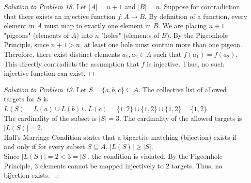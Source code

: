\documentclass[11pt, letterpaper]{article}
\theoremstyle{definition}
\theoremstyle{remark}
\begin{document}
\begin{proof}[Solution to Problem 18]
Let $|A| = n + 1$ and $|B| = n$. Suppose for contradiction that there exists an injective function $f : A \to B$. By definition of a function, every element in $A$ must map to exactly one element in $B$. We are placing $n + 1$ "pigeons" (elements of $A$) into $n$ "holes" (elements of $B$). By the Pigeonhole Principle, since $n + 1 > n$, at least one hole must contain more than one pigeon. Therefore, there exist distinct elements $a_1, a_2 \in A$ such that $f(a_1) = f(a_2)$. This directly contradicts the assumption that $f$ is injective. Thus, no such injective function can exist.
\end{proof}

\begin{proof}[Solution to Problem 19]
Let $S = \{a, b, c\} \subseteq A$. The collective list of allowed targets for $S$ is $L(S) = L(a) \cup L(b) \cup L(c) = \{1, 2\} \cup \{1, 2\} \cup \{1, 2\} = \{1, 2\}$. \\
The cardinality of the subset is $|S| = 3$. The cardinality of the allowed targets is $|L(S)| = 2$. \\
Hall's Marriage Condition states that a bipartite matching (bijection) exists if and only if for every subset $S \subseteq A$, $|L(S)| \ge |S|$. \\
Since $|L(S)| = 2 < 3 = |S|$, the condition is violated. By the Pigeonhole Principle, 3 elements cannot be mapped injectively to 2 targets. Thus, no bijection exists.
\end{proof}
\end{document}
